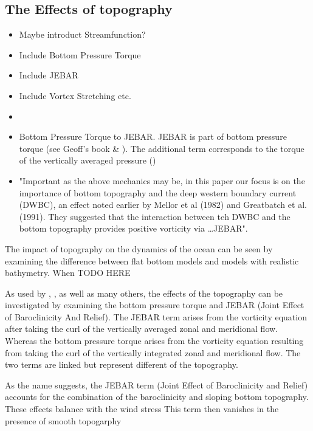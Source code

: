 \documentclass[..\EOYR.tex]{subfiles}
\begin{document}
\subsection{The Effects of topography}
\begin{itemize}
    \item Maybe introduct Streamfunction?
    \item Include Bottom Pressure Torque
    \item Include JEBAR
    \item Include Vortex Stretching etc. \citep{Zhang2007}
    \item \citep{Bell1999}
    \item Bottom Pressure Torque to JEBAR. JEBAR is part of bottom pressure torque (see Geoff's book \& \citep{Greatbatch1991}). The additional term corresponds to the torque of the vertically averaged pressure (\citep{Greatbatch1991})
    \item \citep{Zhang2007} "Important as the above mechanics may be, in this paper our focus is on the importance of bottom topography and the deep western boundary current (DWBC), an effect noted earlier by Mellor et al (1982) and Greatbatch et al. (1991). They suggested that the interaction between teh DWBC and the bottom topography provides positive vorticity via \ldots JEBAR".
\end{itemize}

The impact of topography on the dynamics of the ocean can be seen by examining the difference between flat bottom models and models with realistic bathymetry. 
When  TODO HERE

As used by \citep{Greatbatch1991}, \citep{Bell1999}, \citep{Gula2014} as well as many others, the effects of the topography can be investigated by examining the bottom pressure torque and JEBAR (Joint Effect of Baroclinicity And Relief). 
The JEBAR term arises from the  vorticity equation after taking the curl of the vertically averaged zonal and meridional flow.
Whereas the bottom pressure torque arises from the vorticity equation resulting from taking the curl of the vertically integrated zonal and meridional flow.
The two terms are linked but represent different  of the topography.

As the name suggests, the JEBAR term (Joint Effect of Baroclinicity and Relief) accounts for the combination of the baroclinicity and sloping bottom topography. These effects balance with the wind stress  This term then vanishes in the presence of smooth topogarphy 
\end{document}
